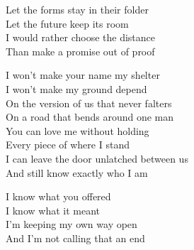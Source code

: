 \begin{lyrics}
Let the forms stay in their folder\\
Let the future keep its room\\
I would rather choose the distance\\
Than make a promise out of proof

I won’t make your name my shelter\\
I won’t make my ground depend\\
On the version of us that never falters\\
On a road that bends around one man\\
You can love me without holding\\
Every piece of where I stand\\
I can leave the door unlatched between us\\
And still know exactly who I am

I know what you offered\\
I know what it meant\\
I’m keeping my own way open\\
And I’m not calling that an end
\end{lyrics}

